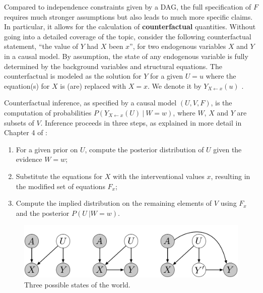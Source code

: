 Compared to independence constraints given by a DAG, the full
specification of $F$ requires much stronger assumptions but also leads
to much more specific claims. In particular, it allows for the
calculation of {\bf counterfactual} quantities. Without going into a
detailed coverage of the topic, consider the following counterfactual
statement, ``the value of $Y$ had $X$ been $x$'', for two endogenous
variables $X$ and $Y$ in a causal model. By assumption, the state of
any endogenous variable is fully determined by
the background variables and structural equations. The counterfactual is
modeled as the solution for $Y$ for a given $U = u$ where the equation(s)
for $X$ is (are) replaced with $X = x$.  We denote it by $Y_{X \leftarrow x}(u)$
\cite{pearl:00}.

Counterfactual inference, as specified by a causal model $(U, V, F)$,
is the computation of probabilities $P(Y_{X \leftarrow x}(U)\ |\ W =
w)$, where $W$, $X$ and $Y$ are subsets of $V$. Inference proceeds in
three steps, as explained in more detail in Chapter 4 of
\cite{pearl:16}:
\begin{enumerate}
\item For a given prior on $U$, compute the posterior distribution of $U$ given the evidence $W = w$;
\item Substitute the equations for $X$ with the interventional values $x$, resulting
     in the modified set of equations $F_x$;
\item Compute the implied distribution on the remaining elements of $V$
     using $F_x$ and the posterior $P(U\ | W = w)$.
\end{enumerate}


\begin{figure}[th!]
\begin{center}
\vspace{-2ex}
\centerline{\includegraphics[width=\textwidth]{simple_models_no_q}}
\vspace{-2ex}
\caption{Three possible states of the world.\label{figure.simple_models}}
\vspace{-2ex}
\end{center}
\end{figure}